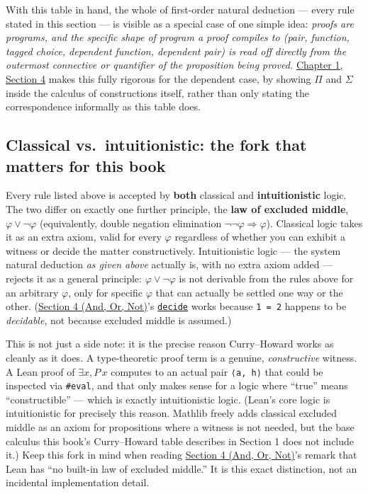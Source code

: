 With this table in hand, the whole of first-order natural deduction --- every rule stated in this section --- is visible as a special case of one simple idea: \emph{proofs are programs, and the specific shape of program a proof compiles to (pair, function, tagged choice, dependent function, dependent pair) is read off directly from the outermost connective or quantifier of the proposition being proved.} \hyperref[sec:01-basics:05-pi-sigma-and-coc:1]{Chapter 1, Section 4} makes this fully rigorous for the dependent case, by showing \(\Pi\) and \(\Sigma\) inside the calculus of constructions itself, rather than only stating the correspondence informally as this table does.

\subsection{Classical vs.~intuitionistic: the fork that matters for this book}\label{sec:03-propositions-and-proofs:02-logic-recap:8}

Every rule listed above is accepted by \textbf{both} classical and \textbf{intuitionistic} logic. The two differ on exactly one further principle, the \textbf{law of excluded middle}, \(\varphi \vee \neg\varphi\) (equivalently, double negation elimination \(\neg\neg\varphi \Rightarrow \varphi\)). Classical logic takes it as an extra axiom, valid for every \(\varphi\) regardless of whether you can exhibit a witness or decide the matter constructively. Intuitionistic logic --- the system natural deduction \emph{as given above} actually is, with no extra axiom added --- rejects it as a general principle: \(\varphi \vee \neg\varphi\) is not derivable from the rules above for an arbitrary \(\varphi\), only for specific \(\varphi\) that can actually be settled one way or the other. (\hyperref[sec:03-propositions-and-proofs:05-and-or-not:1]{Section 4 (And, Or, Not)}'s \href{https://lean-lang.org/doc/reference/latest/Tactic-Proofs/Tactic-Reference/}{\texttt{decide}} works because \texttt{1 = 2} happens to be \emph{decidable}, not because excluded middle is assumed.)

This is not just a side note: it is the precise reason Curry--Howard works as cleanly as it does. A type-theoretic proof term is a genuine, \emph{constructive} witness. A Lean proof of \(\exists x, P\, x\) computes to an actual pair \texttt{⟨a, h⟩} that could be inspected via \texttt{\#eval}, and that only makes sense for a logic where ``true'' means ``constructible'' --- which is exactly intuitionistic logic. (Lean's core logic is intuitionistic for precisely this reason. Mathlib freely adds classical excluded middle as an axiom for propositions where a witness is not needed, but the base calculus this book's Curry--Howard table describes in Section 1 does not include it.) Keep this fork in mind when reading \hyperref[sec:03-propositions-and-proofs:05-and-or-not:1]{Section 4 (And, Or, Not)}'s remark that Lean has ``no built-in law of excluded middle.'' It is this exact distinction, not an incidental implementation detail.

